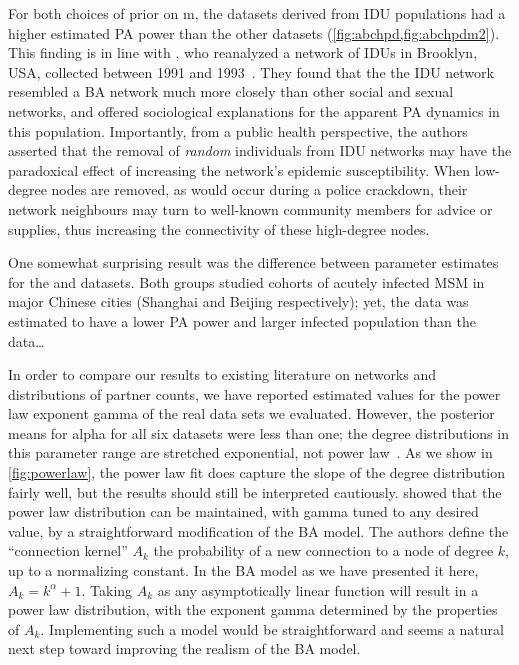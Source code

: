 For both choices of prior on \gls{m}, the datasets derived from \gls{IDU}
populations had a higher estimated \acrlong{PA} power than the other datasets
(\cref{fig:abchpd,fig:abchpdm2}). This finding is in line with
\textcite{dombrowski2013topological}, who reanalyzed a network of \glspl{IDU}
in Brooklyn, USA, collected between 1991 and
1993~\autocite{friedman2006social}. They found that the the \gls{IDU} network 
resembled a \gls{BA} network much more closely than other social and sexual 
networks, and offered sociological explanations for the apparent \acrlong{PA}
dynamics in this population. Importantly, from a public health perspective,
the authors asserted that the removal of \emph{random} individuals from
\gls{IDU} networks may have the paradoxical effect of increasing the network's
epidemic susceptibility. When low-degree nodes are removed, as would occur
during a police crackdown, their network neighbours may turn to well-known
community members for advice or supplies, thus increasing the connectivity of
these high-degree nodes.

One somewhat surprising result was the difference between parameter estimates 
for the \textcite{li2015hiv} and \textcite{wang2015targeting} datasets. Both
groups studied cohorts of acutely infected \gls{MSM} in major Chinese cities
(Shanghai and Beijing respectively); yet, the \citeauthor{li2015hiv} data was 
estimated to have a lower \acrlong{PA} power and larger infected population
than the \textcite{wang2015targeting} data\ldots

In order to compare our results to existing literature on networks and
distributions of partner counts, we have reported estimated values for the
power law exponent \gls{gamma} of the real data sets we evaluated. However, the
posterior means for \gls{alpha} for all six datasets were less than one; the
degree distributions in this parameter range are stretched exponential, not
power law~\autocite{krapivsky2000connectivity}. As we show in
\cref{fig:powerlaw}, the power law fit does capture the slope of the degree
distribution fairly well, but the results should still be interpreted
cautiously. \textcite{krapivsky2000connectivity} showed that the power law
distribution can be maintained, with \gls{gamma} tuned to any desired value, by
a straightforward modification of the \gls{BA} model. The authors define the
``connection kernel'' $A_k$ the probability of a new connection to a node of
degree $k$, up to a normalizing constant. In the \gls{BA} model as we have
presented it here, $A_k = k^{\alpha} + 1$. Taking $A_k$ as any asymptotically
linear function will result in a power law distribution, with the exponent
\gls{gamma} determined by the properties of $A_k$. Implementing such a model
would be straightforward and seems a natural next step toward improving the
realism of the \gls{BA} model.

